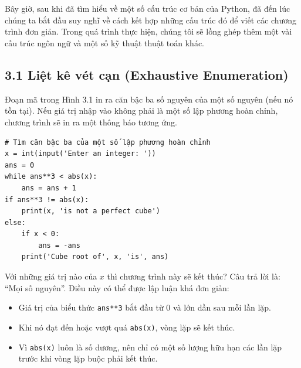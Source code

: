 \newpage
\chapter*{}

\noindent \indent Bây giờ, sau khi đã tìm hiểu về một số cấu trúc cơ bản của Python, đã đến lúc chúng ta bắt đầu suy nghĩ về cách kết hợp những cấu trúc đó để viết các chương trình đơn giản. Trong quá trình thực hiện, chúng tôi sẽ lồng ghép thêm một vài cấu trúc ngôn ngữ và một số kỹ thuật thuật toán khác.

\section*{3.1 Liệt kê vét cạn (Exhaustive Enumeration)}

\noindent \indent Đoạn mã trong Hình 3.1 in ra căn bậc ba số nguyên của một số nguyên (nếu nó tồn tại). Nếu giá trị nhập vào không phải là một số lập phương hoàn chỉnh, chương trình sẽ in ra một thông báo tương ứng.

\begin{tcolorbox}[title=Hình 3.1: Sử dụng phương pháp duyệt cạn kiệt để tìm căn bậc ba]

\begin{verbatim}
# Tìm căn bậc ba của một số lập phương hoàn chỉnh
x = int(input('Enter an integer: '))
ans = 0
while ans**3 < abs(x):
    ans = ans + 1
if ans**3 != abs(x):
    print(x, 'is not a perfect cube')
else:
    if x < 0:
        ans = -ans
    print('Cube root of', x, 'is', ans)
\end{verbatim}

\end{tcolorbox}


Với những giá trị nào của $x$ thì chương trình này sẽ kết thúc? Câu trả lời là: ``Mọi số nguyên''. Điều này có thể được lập luận khá đơn giản:

\begin{itemize}
    \item Giá trị của biểu thức \texttt{ans**3} bắt đầu từ 0 và lớn dần sau mỗi lần lặp.
    \item Khi nó đạt đến hoặc vượt quá \texttt{abs(x)}, vòng lặp sẽ kết thúc.
    \item Vì \texttt{abs(x)} luôn là số dương, nên chỉ có một số lượng hữu hạn các lần lặp trước khi vòng lặp buộc phải kết thúc.
\end{itemize}

